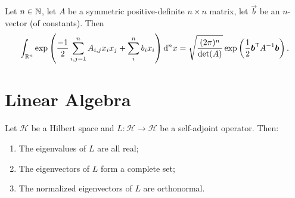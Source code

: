 \begin{theorem}
Let $n\in\mathbb{N}$, let $A$ be a symmetric positive-definite $n\times n$ matrix,
let $\vec{b}$ be an $n$-vector (of constants).
Then
\begin{equation*}
\int_{\mathbb{R}^{n}}\exp\left(\frac{-1}{2}\sum^{n}_{i,j=1}A_{i,j}x_{i}x_{j}+\sum^{n}_{i}b_{i}x_{i}\right)\mathrm{d}^{n}x
=\sqrt{\frac{(2\pi)^{n}}{\det(A)}}\exp\left(\frac{1}{2}\boldsymbol{b}^{\mathsf{T}}A^{-1}\boldsymbol{b}\right).
\end{equation*}
\end{theorem}

\section{Linear Algebra}

\begin{theorem}
Let $\mathcal{H}$ be a Hilbert space and $L\colon \mathcal{H}\to\mathcal{H}$
be a self-adjoint operator. Then:
\begin{enumerate}
\item The eigenvalues of $L$ are all real;
\item The eigenvectors of $L$ form a complete set;
\item The normalized eigenvectors of $L$ are orthonormal.
\end{enumerate}
\end{theorem}
